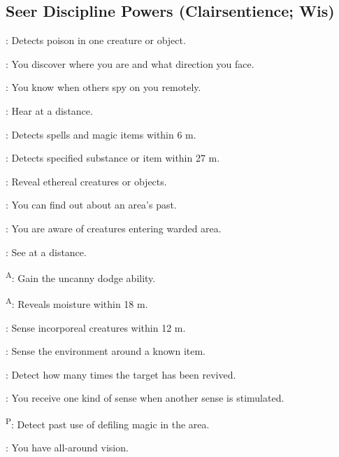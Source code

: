 \subsection{Seer Discipline Powers {\normalsize(Clairsentience; Wis)}}
\begin{enumerate*}
\item {}: Detects poison in one creature or object.

      : You discover where you are and what direction you face.

      : You know when others spy on you remotely.

\item {}: Hear at a distance.

      : Detects spells and magic items within 6 m.

      : Detects specified substance or item within 27 m.

      : Reveal ethereal creatures or objects.

      : You can find out about an area's past.

      : You are aware of creatures entering warded area.

\item {}: See at a distance.

      \textsuperscript{A}: Gain the uncanny dodge ability.

      \textsuperscript{A}: Reveals moisture within 18 m.

      : Sense incorporeal creatures within 12 m.

      : Sense the environment around a known item.

      : Detect how many times the target has been revived.

      : You receive one kind of sense when another sense is stimulated.

      \textsuperscript{P}: Detect past use of defiling magic in the area.

      : You have all-around vision.


\end{enumerate*}
